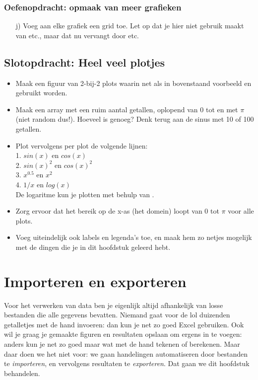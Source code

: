 \documentclass[a4paper,11pt, fleqn]{article}
\newcommand{\ditwc}{Naam van het huidige werkcollege}
\begin{document}

\subsubsection*{Oefenopdracht: opmaak van meer grafieken}
\begin{itemize}
	\item[j)] Voeg aan elke grafiek een grid toe. Let op dat je hier niet gebruik maakt van  etc., maar dat nu vervangt door  etc.
\end{itemize}

\subsection{Slotopdracht: Heel veel plotjes}
\begin{itemize}
	\item Maak een figuur van 2-bij-2 plots waarin net als in bovenstaand voorbeeld  en  gebruikt worden.
	\item Maak een array  met een ruim aantal getallen, oplopend van 0 tot en met $\pi$ (niet random dus!). Hoeveel is genoeg? Denk terug aan de sinus met 10 of 100 getallen.
	\item Plot vervolgens per plot de volgende lijnen:\\
	1. $sin(x)$ en $cos(x)$\\
	2. $sin(x)^2$ en $cos(x)^2$\\
	3. $x^{0.5}$ en $x^2$\\
	4. $1/x$ en $log(x)$\\
	De logaritme kun je plotten met behulp van .
	\item Zorg ervoor dat het bereik op de x-as (het domein) loopt van 0 tot $\pi$ voor alle plots.
	\item Voeg uiteindelijk ook labels en legenda's toe, en maak hem zo netjes mogelijk met de dingen die je in dit hoofdstuk geleerd hebt.
\end{itemize}


\clearpage
\renewcommand{\ditwc}{Importeren en exporteren}
\section[Importeren en exporteren]{\ditwc}
Voor het verwerken van data ben je eigenlijk altijd afhankelijk van losse bestanden die alle gegevens bevatten. Niemand gaat voor de lol duizenden getalletjes met de hand invoeren: dan kun je net zo goed Excel gebruiken. Ook wil je graag je gemaakte figuren en resultaten opslaan om ergens in te voegen: anders kun je net zo goed maar wat met de hand tekenen of berekenen. Maar daar doen we het niet voor: we gaan handelingen automatiseren door bestanden te \textit{importeren}, en vervolgens resultaten te \textit{exporteren}. Dat gaan we dit hoofdstuk behandelen.
\end{document}
